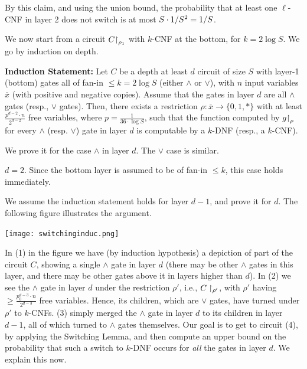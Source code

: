 By this claim, and using the union bound, the probability that at least one $\ell$-CNF in layer 2 does not switch is at most $ S\cdot 1/S^2 = 1/S$.

\bigskip



We now start from a circuit $C{\upharpoonright}_{\rho_1}$ with $k$-CNF at the bottom, for $k = 2 \log S$.
We go by induction on depth.


\begin{tcolorbox}[colframe=white, colback=red!11, boxrule=0mm, sharp corners]
\textbf{Induction Statement:}  
Let $C$ be a depth at least $d$ circuit of size $S$ 
with layer-1 (bottom) gates all of fan-in  $ \leq k=2 \log S$ (either  $\land$ or $\lor$),
with $n$ input variables  
$\overline x$ (with positive and negative copies). Assume that the gates in layer $d$ are all $\land$ gates (resp., $\lor$ gates). 
Then, there exists a restriction $\rho: \overline {x} \rightarrow\{0,1, *\} $ with at least  $\frac{p^{d-2} \cdot n}{2^{d-2}} $ free variables, where $ p=\frac{1}{36 \cdot \log S}$, such that  
the function computed by $g{\upharpoonright}_{\rho}$ for every $\land$ (resp. $\lor$) gate in layer $d$ is computable by a $k$-DNF (resp., a $k$-CNF).  
\end{tcolorbox}

We prove it for the case $\land$ in layer $d$. The $\lor$ case is similar.  

\Base $d = 2$. Since the bottom layer is assumed to be of fan-in $\leq k$,  
this case holds immediately.  

\Induction   
We assume the induction statement holds for layer $d-1$, and prove it for $d$. The following figure illustrates the argument. 
\begin{center}
    \texttt{[image: switchinginduc.png]}
\end{center}
In (1) in the figure  we have (by induction hypothesis) a depiction of part of the circuit $C$, showing a single $\land$ gate in layer $d$ (there  may be other $\land$ gates in this layer, and there may be other gates above it in layers higher than $d$). In (2) we see the $\land$ gate in layer $d$ under the restriction $\rho'$, i.e., $C\upharpoonright_{\rho'}$, with $\rho'$ having $\geq \frac{p_0^{d-3} \cdot n}{2^{d-3}}$ free variables. Hence, its children, which are $\lor$ gates, have turned under $\rho'$ to  $k$-CNFs. (3) simply merged the $\land$ gate in layer $d$ to its children in layer $d-1$, all of which turned to $\land$ gates themselves. Our goal is to get to circuit (4), by applying the Switching Lemma, and then compute an upper bound on the probability that such a switch to $k$-DNF occurs for \emph{all} the gates in layer $d$. We explain this now.

